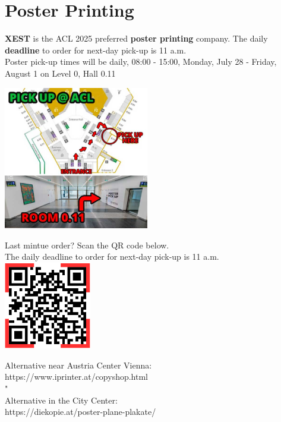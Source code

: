 \chapter{Poster Printing}
\vspace*{0.2cm}


\textbf{XEST} is the ACL 2025 preferred \textbf{poster printing} company. The daily \textbf{deadline} to order for next-day pick-up is 11 a.m.\\
 
Poster pick-up times will be daily, 08:00 - 15:00, Monday, July 28 - Friday, August 1 on Level 0, Hall 0.11\\

\begin{center}
\includegraphics[width=2.5in]{examples/acl25-handbook/local_guide/PosterPickUpMap.png}
\end{center}


\newpage
Last mintue order? Scan the QR code below.\\
The daily deadline to order for next-day pick-up is 11 a.m.\\

\includegraphics[width=1.5in]{examples/acl25-handbook/local_guide/PosterPrintingQRCode.png}




Alternative near Austria Center Vienna:\\
https://www.iprinter.at/copyshop.html	\\																								"
\\
Alternative in the City Center:\\
https://diekopie.at/poster-plane-plakate/\\
